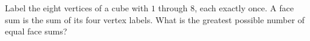 Label the eight vertices of a cube with $1$ through $8$, each exactly once. A face sum is the sum of its four vertex labels. What is the greatest possible number of equal face sums?
